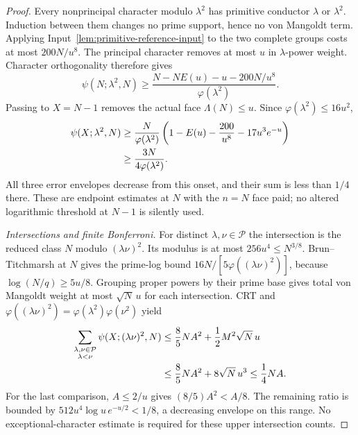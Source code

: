 \documentclass[11pt,a4paper]{article}
\theoremstyle{definition}
\theoremstyle{remark}
\begin{document}
\begin{proof}
Every nonprincipal character modulo $\lambda^2$ has primitive
conductor $\lambda$ or $\lambda^2$.  Induction between them changes
no prime support, hence no von Mangoldt term.  Applying
Input~\ref{lem:primitive-reference-input} to the two complete groups
costs at most $200N/u^8$.  The principal character removes at most
$u$ in $\lambda$-power weight.  Character orthogonality therefore
gives
\[
 \psi(N;\lambda^2,N)
 \geq\frac{N-NE(u)-u-200N/u^8}{\varphi(\lambda^2)}.
\]
Passing to $X=N-1$ removes the actual face $\Lambda(N)\leq u$.
Since $\varphi(\lambda^2)\leq16u^2$,
\begin{align}
 \psi(X;\lambda^2,N)
 &\geq\frac{N}{\varphi(\lambda^2)}
       \left(1-E(u)-\frac{200}{u^8}-17u^3e^{-u}\right)\notag\\
 &\geq\frac{3N}{4\varphi(\lambda^2)}.
 \label{eq:sector-single-square-AP}
\end{align}
All three error envelopes decrease from this onset, and their sum
is less than $1/4$ there.  These are endpoint estimates at $N$ with
the $n=N$ face paid; no altered logarithmic threshold at $N-1$ is
silently used.

\emph{Intersections and finite Bonferroni.}
For distinct $\lambda,\nu\in\mathcal P$ the intersection is the
reduced class $N$ modulo $(\lambda\nu)^2$.  Its modulus is at most
$256u^4\leq N^{3/8}$.  Brun--Titchmarsh at $N$ gives the prime-log
bound $16N/[5\varphi((\lambda\nu)^2)]$, because
$\log(N/q)\geq5u/8$.  Grouping proper powers by their prime base
gives total von Mangoldt weight at most $\sqrt N\,u$ for each
intersection.  CRT and
$\varphi((\lambda\nu)^2)=\varphi(\lambda^2)\varphi(\nu^2)$ yield
\begin{align}
 \sum_{\substack{\lambda,\nu\in\mathcal P\\\lambda<\nu}}
               \psi(X;(\lambda\nu)^2,N)
 &\leq\frac85 NA^2+\frac12M^2\sqrt N\,u\notag\\
 &\leq\frac85 NA^2+8\sqrt N\,u^3
 \leq\frac14 NA.
 \label{eq:sector-square-intersections}
\end{align}
For the last comparison, $A\leq2/u$ gives
$(8/5)A^2< A/8$.  The remaining ratio is bounded by
$512u^4\log u\,e^{-u/2}<1/8$, a decreasing envelope on this range.
No exceptional-character estimate is required for these upper
intersection counts.


\end{proof}
\end{document}
